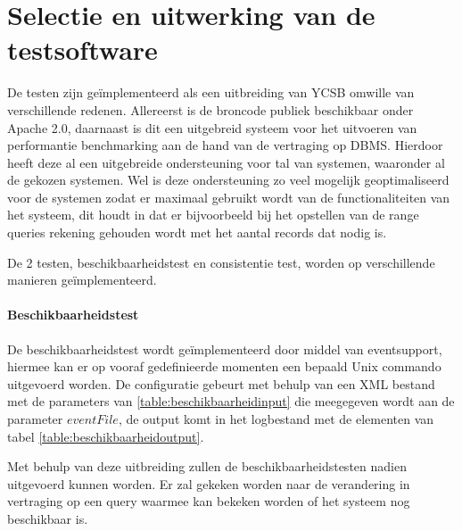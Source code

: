 \section{Selectie en uitwerking van de testsoftware}
De testen zijn geïmplementeerd als een uitbreiding van YCSB\cite{cooper2010benchmarking} omwille van verschillende redenen. Allereerst is de broncode publiek beschikbaar onder Apache 2.0, daarnaast is dit een uitgebreid systeem voor het uitvoeren van performantie benchmarking aan de hand van de vertraging op DBMS. Hierdoor heeft deze al een uitgebreide ondersteuning voor tal van systemen, waaronder al de gekozen systemen. Wel is deze ondersteuning zo veel mogelijk geoptimaliseerd voor de systemen zodat er maximaal gebruikt wordt van de functionaliteiten van het systeem, dit houdt in dat er bijvoorbeeld bij het opstellen van de range queries rekening gehouden wordt met het aantal records dat nodig is. 

De 2 testen, beschikbaarheidstest en consistentie test, worden op verschillende manieren geïmplementeerd. 

\paragraph{Beschikbaarheidstest} De beschikbaarheidstest wordt geïmplementeerd door middel van \gls{eventsupport}, hiermee kan er op vooraf gedefinieerde momenten een bepaald Unix commando uitgevoerd worden. De configuratie gebeurt met behulp van een XML bestand met de parameters van \ref{table:beschikbaarheidinput} die meegegeven wordt aan de parameter $eventFile$, de output komt in het logbestand met de elementen van tabel \ref{table:beschikbaarheidoutput}. 

Met behulp van deze uitbreiding zullen de beschikbaarheidstesten nadien uitgevoerd kunnen worden. Er zal gekeken worden naar de verandering in vertraging op een query waarmee kan bekeken worden of het systeem nog beschikbaar is. 


